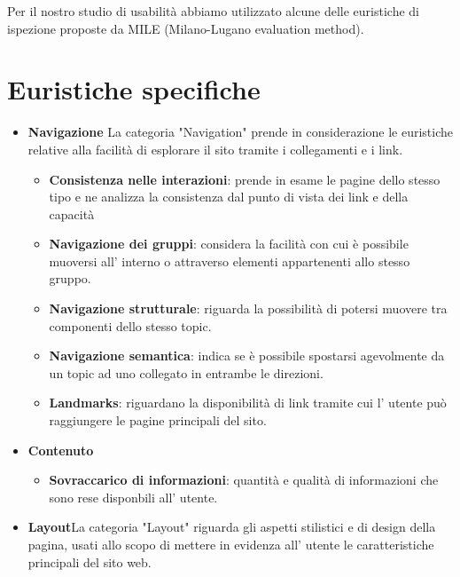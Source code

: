     Per il nostro studio di usabilità abbiamo utilizzato alcune delle euristiche
    di ispezione proposte da MILE (Milano-Lugano evaluation method).
    \section{Euristiche specifiche}
        \begin{itemize}
            \item \textbf{Navigazione} La categoria "Navigation" prende in
            considerazione le euristiche relative alla facilità di esplorare il
            sito tramite i collegamenti e i link.
            \begin{itemize}
                \item \textbf{Consistenza nelle interazioni}: prende in esame le
                pagine dello stesso tipo e ne analizza la consistenza dal punto
                di vista dei link e della capacità
                \item \textbf{Navigazione dei gruppi}: considera la facilità con
                cui è possibile muoversi all' interno o attraverso elementi
                appartenenti allo stesso gruppo.
                \item \textbf{Navigazione strutturale}: riguarda la possibilità
                di potersi muovere tra componenti dello stesso topic.
                \item \textbf{Navigazione semantica}: indica se è possibile
                spostarsi agevolmente da un topic ad uno collegato in entrambe
                le direzioni.
                \item \textbf{Landmarks}: riguardano la disponibilità di link
                tramite cui l' utente può raggiungere le pagine principali del
                sito.
            \end{itemize}
            \item \textbf{Contenuto}
            \begin{itemize}
                \item \textbf{Sovraccarico di informazioni}: quantità e qualità
                di informazioni che sono rese disponbili all' utente.
            \end{itemize}
            \item \textbf{Layout}La categoria "Layout" riguarda gli aspetti
            stilistici e di design della pagina, usati allo scopo di mettere in
            evidenza all' utente le caratteristiche principali del sito web.

\end{itemize}
